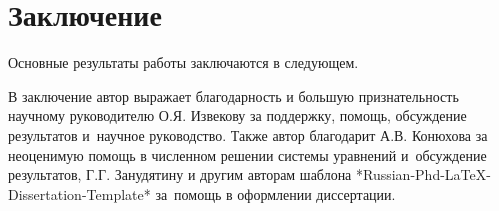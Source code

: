 \chapter*{Заключение}                       %


Основные результаты работы заключаются в следующем.


В заключение автор выражает благодарность и большую признательность научному руководителю
О.Я. Извекову за поддержку, помощь, обсуждение результатов и~научное
руководство. Также автор благодарит А.В. Конюхова
за неоценимую помощь в численном решении системы уравнений и~обсуждение результатов, Г.Г. Занудятину и другим авторам шаблона *Russian-Phd-LaTeX-Dissertation-Template* за~помощь в оформлении
диссертации.
